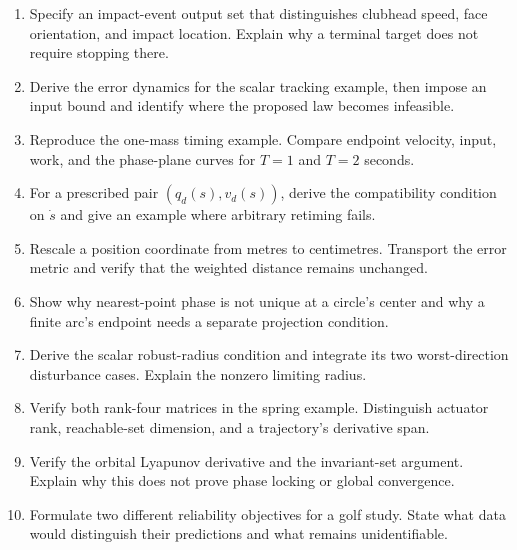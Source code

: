 \documentclass[12pt, openany]{book}
\theoremstyle{plain}
\begin{document}
\begin{enumerate}
\item Specify an impact-event output set that distinguishes clubhead speed,
      face orientation, and impact location. Explain why a terminal target
      does not require stopping there.
\item Derive the error dynamics for the scalar tracking example, then impose
      an input bound and identify where the proposed law becomes infeasible.
\item Reproduce the one-mass timing example. Compare endpoint velocity, input,
      work, and the phase-plane curves for $T=1$ and $T=2$ seconds.
\item For a prescribed pair $(q_d(s),v_d(s))$, derive the compatibility condition
      on $\dot s$ and give an example where arbitrary retiming fails.
\item Rescale a position coordinate from metres to centimetres. Transport the
      error metric and verify that the weighted distance remains unchanged.
\item Show why nearest-point phase is not unique at a circle's center and why
      a finite arc's endpoint needs a separate projection condition.
\item Derive the scalar robust-radius condition and integrate its two
      worst-direction disturbance cases. Explain the nonzero limiting radius.
\item Verify both rank-four matrices in the spring example. Distinguish
      actuator rank, reachable-set dimension, and a trajectory's derivative span.
\item Verify the orbital Lyapunov derivative and the invariant-set argument.
      Explain why this does not prove phase locking or global convergence.
\item Formulate two different reliability objectives for a golf study. State
      what data would distinguish their predictions and what remains unidentifiable.
\end{enumerate}
\end{document}
